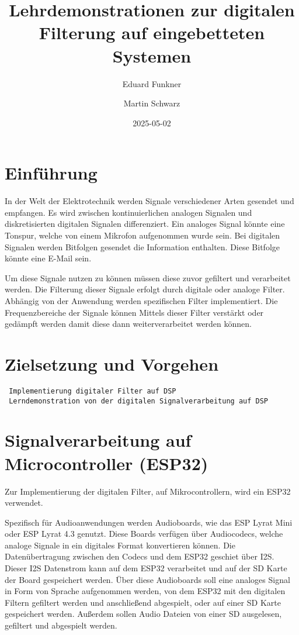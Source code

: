 \documentclass[
  ngerman,
  letterpaper,
  DIV=11]{scrreprt}
\title{Lehrdemonstrationen zur digitalen Filterung auf eingebetteten
Systemen}
\author{Eduard Funkner \and Martin Schwarz}
\date{2025-05-02}
\renewcommand*\contentsname{Inhaltsverzeichnis}
\newcommand\contentsname{Inhaltsverzeichnis}
\begin{document}
\maketitle

\renewcommand*\contentsname{Inhaltsverzeichnis}
{
\hypersetup{linkcolor=}
\setcounter{tocdepth}{2}
\tableofcontents
}

\chapter{Einführung}\label{einfuxfchrung}

In der Welt der Elektrotechnik werden Signale verschiedener Arten
gesendet und empfangen. Es wird zwischen kontinuierlichen analogen
Signalen und diskretisierten digitalen Signalen differenziert. Ein
analoges Signal könnte eine Tonspur, welche von einem Mikrofon
aufgenommen wurde sein. Bei digitalen Signalen werden Bitfolgen gesendet
die Information enthalten. Diese Bitfolge könnte eine E-Mail sein.

Um diese Signale nutzen zu können müssen diese zuvor gefiltert und
verarbeitet werden. Die Filterung dieser Signale erfolgt durch digitale
oder analoge Filter. Abhängig von der Anwendung werden spezifischen
Filter implementiert. Die Frequenzbereiche der Signale können Mittels
dieser Filter verstärkt oder gedämpft werden damit diese dann
weiterverarbeitet werden können.

\chapter{Zielsetzung und Vorgehen}\label{zielsetzung-und-vorgehen}

\begin{verbatim}
 Implementierung digitaler Filter auf DSP
 Lerndemonstration von der digitalen Signalverarbeitung auf DSP
\end{verbatim}

\chapter{Signalverarbeitung auf Microcontroller
(ESP32)}\label{signalverarbeitung-auf-microcontroller-esp32}

Zur Implementierung der digitalen Filter, auf Mikrocontrollern, wird ein
ESP32 verwendet.

Spezifisch für Audioanwendungen werden Audioboards, wie das ESP Lyrat
Mini oder ESP Lyrat 4.3 genutzt. Diese Boards verfügen über Audiocodecs,
welche analoge Signale in ein digitales Format konvertieren können. Die
Datenübertragung zwischen den Codecs und dem ESP32 geschiet über I2S.
Dieser I2S Datenstrom kann auf dem ESP32 verarbeitet und auf der SD
Karte der Board gespeichert werden. Über diese Audioboards soll eine
analoges Signal in Form von Sprache aufgenommen werden, von dem ESP32
mit den digitalen Filtern gefiltert werden und anschließend abgespielt,
oder auf einer SD Karte gespeichert werden. Außerdem sollen Audio
Dateien von einer SD ausgelesen, gefiltert und abgespielt werden.
\end{document}
